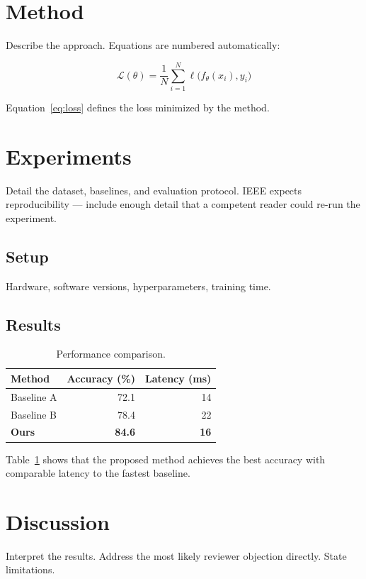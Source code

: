 \documentclass[conference]{IEEEtran}
\begin{document}
\section{Method}
Describe the approach. Equations are numbered automatically:

\begin{equation}
  \mathcal{L}(\theta) = \frac{1}{N}\sum_{i=1}^{N} \ell\bigl(f_\theta(x_i), y_i\bigr)
  \label{eq:loss}
\end{equation}

Equation~\eqref{eq:loss} defines the loss minimized by the method.

\section{Experiments}
Detail the dataset, baselines, and evaluation protocol. IEEE expects reproducibility — include enough detail that a competent reader could re-run the experiment.

\subsection{Setup}
Hardware, software versions, hyperparameters, training time.

\subsection{Results}

\begin{table}[htbp]
  \caption{Performance comparison.}
  \label{tab:results}
  \centering
  \begin{tabular}{lrr}
    \toprule
    Method & Accuracy (\%) & Latency (ms) \\
    \midrule
    Baseline A \cite{ref1} & 72.1 & 14 \\
    Baseline B \cite{ref2} & 78.4 & 22 \\
    \textbf{Ours}          & \textbf{84.6} & \textbf{16} \\
    \bottomrule
  \end{tabular}
\end{table}

Table~\ref{tab:results} shows that the proposed method achieves the best accuracy with comparable latency to the fastest baseline.

\section{Discussion}
Interpret the results. Address the most likely reviewer objection directly. State limitations.
\end{document}
